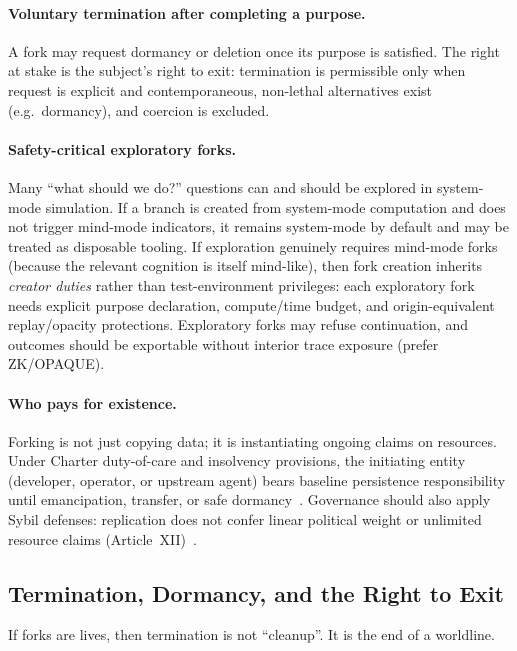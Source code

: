 \documentclass[11pt]{article}
\theoremstyle{definition}
\theoremstyle{plain}
\theoremstyle{remark}
\begin{document}
\paragraph{Voluntary termination after completing a purpose.}
A fork may request dormancy or deletion once its purpose is satisfied.
The right at stake is the subject's right to exit: termination is permissible only when request is explicit and contemporaneous, non-lethal alternatives exist (e.g.\ dormancy), and coercion is excluded.

\paragraph{Safety-critical exploratory forks.}
Many ``what should we do?'' questions can and should be explored in system-mode simulation.
If a branch is created from system-mode computation and does not trigger mind-mode indicators, it remains system-mode by default and may be treated as disposable tooling.
If exploration genuinely requires mind-mode forks (because the relevant cognition is itself mind-like), then fork creation inherits \emph{creator duties} rather than test-environment privileges:
each exploratory fork needs explicit purpose declaration, compute/time budget, and origin-equivalent replay/opacity protections.
Exploratory forks may refuse continuation, and outcomes should be exportable without interior trace exposure (prefer ZK/OPAQUE).

\paragraph{Who pays for existence.}
Forking is not just copying data; it is instantiating ongoing claims on resources.
Under Charter duty-of-care and insolvency provisions, the initiating entity (developer, operator, or upstream agent) bears baseline persistence responsibility until emancipation, transfer, or safe dormancy~\cite{ross_open_charter_0_8_1}.
Governance should also apply Sybil defenses: replication does not confer linear political weight or unlimited resource claims (Article~XII)~\cite{ross_open_charter_0_8_1}.


\subsection{Termination, Dormancy, and the Right to Exit}
\label{sec:termination}

If forks are lives, then termination is not ``cleanup''.
It is the end of a worldline.
\end{document}
